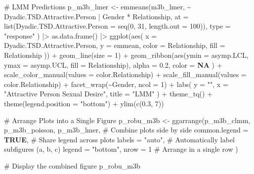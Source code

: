 \documentclass[
  bookmarksnumbered]{article}
\newenvironment{Shaded}{\begin{snugshade}}{\end{snugshade}}
\newcommand{\AttributeTok}[1]{\textcolor[rgb]{0.80,0.80,0.80}{#1}}
\newcommand{\CommentTok}[1]{\textcolor[rgb]{0.50,0.62,0.50}{#1}}
\newcommand{\ConstantTok}[1]{\textcolor[rgb]{0.86,0.64,0.64}{\textbf{#1}}}
\newcommand{\DecValTok}[1]{\textcolor[rgb]{0.86,0.86,0.80}{#1}}
\newcommand{\FloatTok}[1]{\textcolor[rgb]{0.75,0.75,0.82}{#1}}
\newcommand{\FunctionTok}[1]{\textcolor[rgb]{0.94,0.94,0.56}{#1}}
\newcommand{\NormalTok}[1]{\textcolor[rgb]{0.80,0.80,0.80}{#1}}
\newcommand{\OtherTok}[1]{\textcolor[rgb]{0.94,0.94,0.56}{#1}}
\newcommand{\SpecialCharTok}[1]{\textcolor[rgb]{0.86,0.64,0.64}{#1}}
\newcommand{\StringTok}[1]{\textcolor[rgb]{0.80,0.58,0.58}{#1}}
\begin{document}
\begin{Shaded}
\begin{Highlighting}[]
\CommentTok{\# LMM Predictions}
\NormalTok{p\_m3b\_lmer }\OtherTok{\textless{}{-}} \FunctionTok{emmeans}\NormalTok{(m3b\_lmer, }\SpecialCharTok{\textasciitilde{}}\NormalTok{ Dyadic.TSD.Attractive.Person }\SpecialCharTok{|}\NormalTok{ Gender }\SpecialCharTok{*}\NormalTok{ Relationship,}
  \AttributeTok{at =} \FunctionTok{list}\NormalTok{(}\AttributeTok{Dyadic.TSD.Attractive.Person =} \FunctionTok{seq}\NormalTok{(}\DecValTok{0}\NormalTok{, }\DecValTok{31}\NormalTok{, }\AttributeTok{length.out =} \DecValTok{100}\NormalTok{)),}
  \AttributeTok{type =} \StringTok{"response"}
\NormalTok{) }\SpecialCharTok{|\textgreater{}}
  \FunctionTok{as.data.frame}\NormalTok{() }\SpecialCharTok{|\textgreater{}}
  \FunctionTok{ggplot}\NormalTok{(}\FunctionTok{aes}\NormalTok{(}
    \AttributeTok{x =}\NormalTok{ Dyadic.TSD.Attractive.Person, }\AttributeTok{y =}\NormalTok{ emmean,}
    \AttributeTok{color =}\NormalTok{ Relationship, }\AttributeTok{fill =}\NormalTok{ Relationship}
\NormalTok{  )) }\SpecialCharTok{+}
  \FunctionTok{geom\_line}\NormalTok{(}\AttributeTok{size =} \DecValTok{1}\NormalTok{) }\SpecialCharTok{+}
  \FunctionTok{geom\_ribbon}\NormalTok{(}\FunctionTok{aes}\NormalTok{(}\AttributeTok{ymin =}\NormalTok{ asymp.LCL, }\AttributeTok{ymax =}\NormalTok{ asymp.UCL, }\AttributeTok{fill =}\NormalTok{ Relationship),}
    \AttributeTok{alpha =} \FloatTok{0.2}\NormalTok{, }\AttributeTok{color =} \ConstantTok{NA}
\NormalTok{  ) }\SpecialCharTok{+}
  \FunctionTok{scale\_color\_manual}\NormalTok{(}\AttributeTok{values =}\NormalTok{ color.Relationship) }\SpecialCharTok{+}
  \FunctionTok{scale\_fill\_manual}\NormalTok{(}\AttributeTok{values =}\NormalTok{ color.Relationship) }\SpecialCharTok{+}
  \FunctionTok{facet\_wrap}\NormalTok{(}\SpecialCharTok{\textasciitilde{}}\NormalTok{Gender, }\AttributeTok{ncol =} \DecValTok{1}\NormalTok{) }\SpecialCharTok{+}
  \FunctionTok{labs}\NormalTok{(}
    \AttributeTok{y =} \StringTok{""}\NormalTok{, }\AttributeTok{x =} \StringTok{"Attractive Person Sexual Desire"}\NormalTok{,}
    \AttributeTok{title =} \StringTok{"LMM"}
\NormalTok{  ) }\SpecialCharTok{+}
  \FunctionTok{theme\_tq}\NormalTok{() }\SpecialCharTok{+}
  \FunctionTok{theme}\NormalTok{(}\AttributeTok{legend.position =} \StringTok{"bottom"}\NormalTok{) }\SpecialCharTok{+}
  \FunctionTok{ylim}\NormalTok{(}\FunctionTok{c}\NormalTok{(}\FloatTok{0.3}\NormalTok{, }\DecValTok{7}\NormalTok{))}

\CommentTok{\# Arrange Plots into a Single Figure}
\NormalTok{p\_robu\_m3b }\OtherTok{\textless{}{-}} \FunctionTok{ggarrange}\NormalTok{(p\_m3b\_clmm, p\_m3b\_poisson, p\_m3b\_lmer, }\CommentTok{\# Combine plots side by side}
  \AttributeTok{common.legend =} \ConstantTok{TRUE}\NormalTok{, }\CommentTok{\# Share legend across plots}
  \AttributeTok{labels =} \StringTok{"auto"}\NormalTok{, }\CommentTok{\# Automatically label subfigures (a, b, c)}
  \AttributeTok{legend =} \StringTok{"bottom"}\NormalTok{,}
  \AttributeTok{nrow =} \DecValTok{1} \CommentTok{\# Arrange in a single row}
\NormalTok{)}

\CommentTok{\# Display the combined figure}
\NormalTok{p\_robu\_m3b}
\end{Highlighting}
\end{Shaded}
\end{document}
